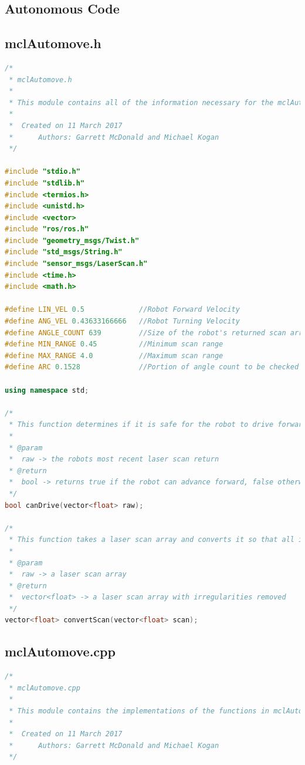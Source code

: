 \documentclass{article}
\begin{document}
\begin{appendices}
\section{Autonomous Code}
\subsection{mclAutomove.h}
\begin{lstlisting}[language=C++]
/*
 * mclAutomove.h
 *
 * This module contains all of the information necessary for the mclAutomove ROS Package
 *
 * 	Created on 11 March 2017
 *		Authors: Garrett McDonald and Michael Kogan
 */
 
#include "stdio.h"
#include "stdlib.h"
#include <termios.h>          
#include <unistd.h> 
#include <vector>
#include "ros/ros.h"
#include "geometry_msgs/Twist.h"
#include "std_msgs/String.h"
#include "sensor_msgs/LaserScan.h"
#include <time.h>
#include <math.h>

#define LIN_VEL 0.5				//Robot Forward Velocity
#define ANG_VEL 0.43633166666	//Robot Turning Velocity
#define ANGLE_COUNT 639			//Size of the robot's returned scan array
#define MIN_RANGE 0.45			//Minimum scan range
#define MAX_RANGE 4.0			//Maximum scan range
#define ARC 0.1528				//Portion of angle count to be checked left and right for obstacles

using namespace std;

/*
 * This function determines if it is safe for the robot to drive forward
 *
 * @param
 *  raw -> the robots most recent laser scan return
 * @return
 *  bool -> returns true if the robot can advance forward, false otherwise
 */
bool canDrive(vector<float> raw);

/*
 * This function takes a laser scan array and converts it so that all irregular values are replaced by the max range
 *
 * @param
 *  raw -> a laser scan array
 * @return
 *  vector<float> -> a laser scan array with irregularities removed
 */
vector<float> convertScan(vector<float> scan);
\end{lstlisting}

\subsection{mclAutomove.cpp}
\begin{lstlisting}[language=C++]
/*
 * mclAutomove.cpp
 *
 * This module contains the implementations of the functions in mclAutomove.h
 *
 * 	Created on 11 March 2017
 *		Authors: Garrett McDonald and Michael Kogan
 */


\end{lstlisting}
\end{appendices}
\end{document}
